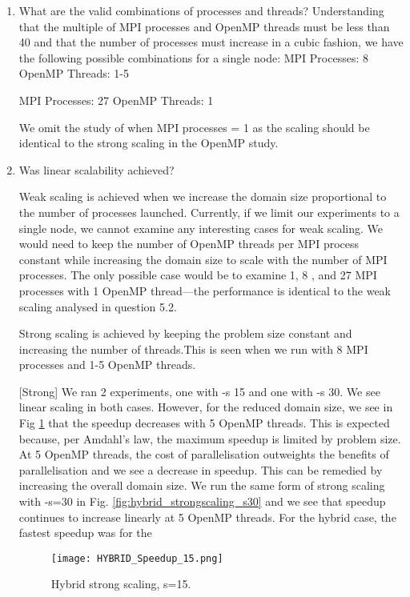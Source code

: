 \documentclass{article}
\begin{document}
\begin{enumerate}
	\item What are the valid combinations of processes and threads?
	Understanding that the multiple of MPI processes and OpenMP threads must be less than 40 and that the number of processes must increase in a cubic fashion, we have the following possible combinations for a single node:
	MPI Processes: 8
	OpenMP Threads: 1-5
	
	MPI Processes: 27
	OpenMP Threads: 1
	
	We omit the study of when MPI processes = 1 as the scaling should be identical to the strong scaling in the OpenMP study.
	
	\item Was linear scalability achieved?
	
	Weak scaling is achieved when we increase the domain size proportional to the number of processes launched. Currently, if we limit our experiments to a single node, we cannot examine any interesting cases for weak scaling. We would need to keep the number of OpenMP threads per MPI process constant while increasing the domain size to scale with the number of MPI processes. The only possible case would be to examine 1, 8 , and 27 MPI processes with 1 OpenMP thread---the performance is identical to the weak scaling analysed in question 5.2.
	
	Strong scaling is achieved by keeping the problem size constant and increasing the number of threads.This is seen when we run with 8 MPI processes and 1-5 OpenMP threads. 
	
	[Strong] We ran 2 experiments, one with -s 15 and one with -s 30. We see linear scaling in both cases. However, for the reduced domain size, we see in Fig \ref{fig:hybrid_strongscaling_s15} that the speedup decreases with 5 OpenMP threads. This is expected because, per Amdahl's law, the maximum speedup is limited by problem size. At 5 OpenMP threads, the cost of parallelisation outweights the benefits of parallelisation and we see a decrease in speedup. This can be remedied by increasing the overall domain size. We run the same form of strong scaling with -s=30 in Fig. \ref{fig:hybrid_strongscaling_s30} and we see that speedup continues to increase linearly at 5 OpenMP threads. For the hybrid case, the fastest speedup was for the 
	
			\begin{figure}[p] %
		 	\begin{center}
		 		\texttt{[image: HYBRID\_Speedup\_15.png]} %
		 		\caption{Hybrid strong scaling, s=15.}
		 		\label{fig:hybrid_strongscaling_s15}
		 	\end{center}
		\end{figure}
		

\end{enumerate}
\end{document}
